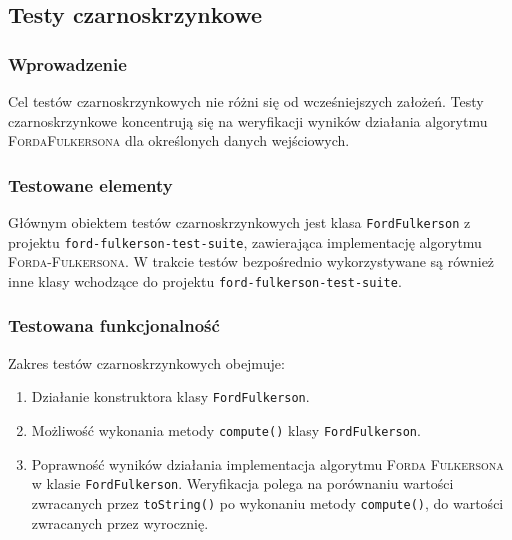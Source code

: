 \subsection{Testy czarno\dywiz skrzynkowe}

\subsubsection{Wprowadzenie}
Cel testów czarno\dywiz skrzynkowych nie różni się od wcześniejszych założeń.
Testy czarno\dywiz skrzynkowe koncentrują się na weryfikacji wyników działania
algorytmu \textsc{Forda\dywiz Fulkersona} dla określonych danych wejściowych.

\subsubsection{Testowane elementy}
Głównym obiektem testów czarno\dywiz skrzynkowych jest klasa
\texttt{FordFulkerson} z projektu \texttt{ford-fulkerson-test-suite},
zawierająca implementację algorytmu \textsc{Forda-Fulkersona}. W trakcie testów
bezpośrednio wykorzystywane są również inne klasy wchodzące do projektu
\texttt{ford-fulkerson-test-suite}.

\subsubsection{Testowana funkcjonalność}
Zakres testów czarno\dywiz skrzynkowych obejmuje:
\begin{enumerate}
    \item Działanie konstruktora klasy \texttt{FordFulkerson}.
    \item Możliwość wykonania metody \texttt{compute()} klasy \texttt{FordFulkerson}.
    \item Poprawność wyników działania implementacja algorytmu \textsc{Forda\dywiz
        Fulkersona} w klasie \texttt{FordFulkerson}. Weryfikacja polega na
        porównaniu wartości zwracanych przez \texttt{toString()} po wykonaniu
        metody \texttt{compute()}, do wartości zwracanych przez wyrocznię.
\end{enumerate}

